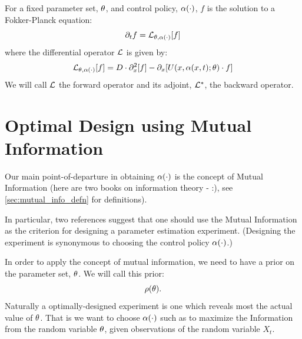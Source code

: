\documentclass{article}
\begin{document}
For a fixed parameter set, ${\theta}$, and control policy, ${\alpha}(\cdot)$, $f$ is the
solution to a Fokker-Planck equation:
\begin{equation}
{\partial}_t f = { \mathcal{L} }_{{\theta}, {\alpha}(\cdot)}[f]
\label{eq:fokker_planck_forward_density}
\end{equation}
where the differential operator ${ \mathcal{L} }$ is given by:
$$
{ \mathcal{L} }_{{\theta}, {\alpha}(\cdot)}[f] = D \cdot {\partial}_x^2 [f] - {\partial}_x[U(x,{\alpha}(x,t); {\theta}) \cdot f]
$$
We will call ${ \mathcal{L} }$ the forward operator and its adjoint, ${ { \mathcal{L} }^* }$, the backward
operator.


\section{Optimal Design using Mutual Information}
Our main point-of-departure in obtaining ${\alpha}(\cdot)$ is the concept of Mutual
Information (here are two books on information theory -
\cite{Cover2006,MacKay2003} :), see \cref{sec:mutual_info_defn} for
definitions).

In particular, two references suggest that one should use the Mutual
Information \cite{Myung2013,Lewi2009} as the criterion for designing a parameter
estimation experiment. (Designing the experiment is synonymous to
choosing the control policy ${\alpha}(\cdot)$.)

In order to apply the concept of mutual information, we need to have a prior on
the parameter set, ${\theta}$. We will call this prior: 
$$\rho({\theta}).$$ 
Naturally a optimally-designed experiment is one which reveals most the actual
value of ${\theta}$. That is we want to choose ${\alpha}(\cdot)$ such as to maximize the
Information from the random variable ${\theta}$, given observations of the random
variable $X_t$.
\end{document}
